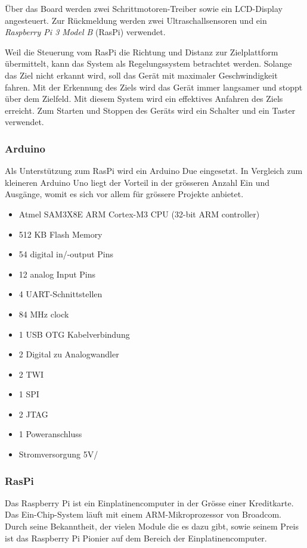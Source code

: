 \documentclass[a4paper]{report}
\begin{document}
Über das Board werden zwei Schrittmotoren-Treiber sowie ein LCD-Display angesteuert. Zur Rückmeldung werden zwei Ultraschallsensoren und ein \textit{Raspberry Pi 3 Model B} (RasPi) verwendet.

Weil die Steuerung vom RasPi die Richtung und Distanz zur Zielplattform übermittelt, kann das System als Regelungssystem betrachtet werden. Solange das Ziel nicht erkannt wird, soll das Gerät mit maximaler Geschwindigkeit fahren. Mit der Erkennung des Ziels wird das Gerät immer langsamer und stoppt über dem Zielfeld. Mit diesem System wird ein effektives Anfahren des Ziels erreicht. Zum Starten und Stoppen des Geräts wird ein Schalter und ein Taster verwendet.

\subsubsection{Arduino}

Als Unterstützung zum RasPi wird ein Arduino Due eingesetzt. In Vergleich zum kleineren Arduino Uno liegt der Vorteil in der grösseren Anzahl Ein und Ausgänge, womit es sich vor allem für grössere Projekte anbietet.



\begin{itemize}[noitemsep]
	\item Atmel SAM3X8E ARM Cortex-M3 CPU (32-bit ARM controller)
	\item 512 KB Flash Memory
	\item 54 digital in/-output Pins
	\item 12 analog Input Pins
	\item 4 UART-Schnittstellen
	\item 84 MHz clock
	\item 1 USB OTG Kabelverbindung
	\item 2 Digital zu Analogwandler
	\item 2 TWI
	\item 1 SPI
	\item 2 JTAG
	\item 1 Poweranschluss
	\item Stromversorgung 5V/
\end{itemize}\parencite{ArduinoDue2018}

\subsubsection{RasPi}
Das Raspberry Pi ist ein Einplatinencomputer in der Grösse einer Kreditkarte. Das Ein-Chip-System läuft mit einem ARM-Mikroprozessor von Broadcom. Durch seine Bekanntheit, der vielen Module die es dazu gibt, sowie seinem Preis ist das Raspberry Pi Pionier auf dem Bereich der Einplatinencomputer.
\end{document}
